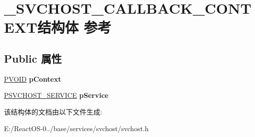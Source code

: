 \hypertarget{struct___s_v_c_h_o_s_t___c_a_l_l_b_a_c_k___c_o_n_t_e_x_t}{}\section{\+\_\+\+S\+V\+C\+H\+O\+S\+T\+\_\+\+C\+A\+L\+L\+B\+A\+C\+K\+\_\+\+C\+O\+N\+T\+E\+X\+T结构体 参考}
\label{struct___s_v_c_h_o_s_t___c_a_l_l_b_a_c_k___c_o_n_t_e_x_t}
\subsection*{Public 属性}
\begin{DoxyCompactItemize}
\item 
\mbox{\label{struct___s_v_c_h_o_s_t___c_a_l_l_b_a_c_k___c_o_n_t_e_x_t_a64b81be4c6f5aeebaafe5ce23398a341}} 
\hyperlink{interfacevoid}{P\+V\+O\+ID} {\bfseries p\+Context}
\item 
\mbox{\label{struct___s_v_c_h_o_s_t___c_a_l_l_b_a_c_k___c_o_n_t_e_x_t_a145169231d18ffea9103bf58e749bebc}} 
\hyperlink{struct___s_v_c_h_o_s_t___s_e_r_v_i_c_e}{P\+S\+V\+C\+H\+O\+S\+T\+\_\+\+S\+E\+R\+V\+I\+CE} {\bfseries p\+Service}
\end{DoxyCompactItemize}


该结构体的文档由以下文件生成\+:\begin{DoxyCompactItemize}
\item 
E\+:/\+React\+O\+S-\/0../base/services/svchost/svchost.\+h\end{DoxyCompactItemize}
